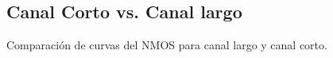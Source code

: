 
\everymath{\displaystyle} %


  
\subsection{Canal Corto vs. Canal largo}
Comparación de curvas del NMOS para canal largo y canal corto.


%
 
 

